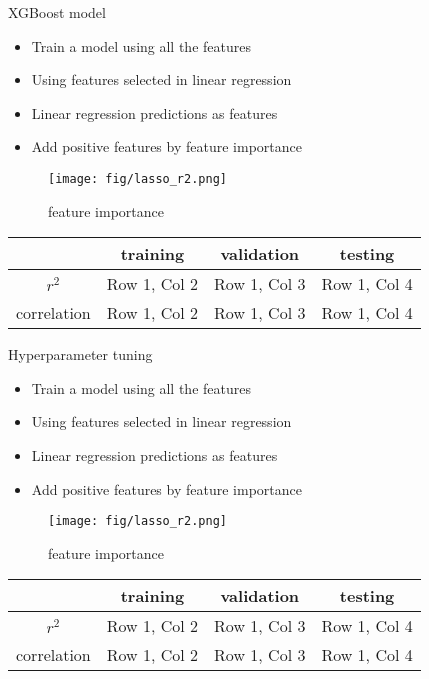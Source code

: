 \documentclass[10pt]{beamer}
\begin{document}
\begin{frame}{XGBoost model}


\begin{itemize}
    \item Train a model using all the features
    \item Using features selected in linear regression
    \item Linear regression predictions as features
    \item Add positive features by feature importance
\end{itemize}


\begin{figure}
    \centering
    \texttt{[image: fig/lasso\_r2.png]}
    \caption{feature importance}
\end{figure}


\begin{table}[h!]
\centering
\begin{tabular}{c|c|c|c}
\hline
 & \textbf{training} & \textbf{validation} & \textbf{testing} \\ \hline
$r^2$      & Row 1, Col 2      & Row 1, Col 3      & Row 1, Col 4      \\ \hline
correlation      & Row 1, Col 2      & Row 1, Col 3      & Row 1, Col 4      \\ \hline
\end{tabular}
\end{table}


\end{frame}

\begin{frame}{Hyperparameter tuning}


\begin{itemize}
    \item Train a model using all the features
    \item Using features selected in linear regression
    \item Linear regression predictions as features
    \item Add positive features by feature importance
\end{itemize}


\begin{figure}
    \centering
    \texttt{[image: fig/lasso\_r2.png]}
    \caption{feature importance}
\end{figure}


\begin{table}[h!]
\centering
\begin{tabular}{c|c|c|c}
\hline
 & \textbf{training} & \textbf{validation} & \textbf{testing} \\ \hline
$r^2$      & Row 1, Col 2      & Row 1, Col 3      & Row 1, Col 4      \\ \hline
correlation      & Row 1, Col 2      & Row 1, Col 3      & Row 1, Col 4      \\ \hline
\end{tabular}
\end{table}


\end{frame}
\end{document}

